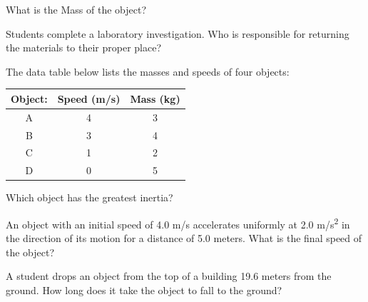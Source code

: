 \documentclass[10pt]{examdesign}
\begin{document}
\begin{multiplechoice} [title={Multiple Choice},
	rearrange=yes]
\begin{question}
	What is the Mass of the object?
	
\end{question}

\begin{question}
	Students complete a laboratory investigation.  Who is responsible for returning the materials to their proper place?
	\end{question}




\begin{question}
The data table below lists the masses and speeds of four objects:


\begin{center}
	\begin{tabular}{ | c | c | c | }
	\hline
		Object: & Speed (m/s) & Mass (kg) \\ 
		\hline
		A & 4 & 3 \\  
		\hline
		B & 3 & 4    \\
		\hline
		C & 1 & 2    \\
		\hline
		D & 0 & 5    \\
		\hline
	\end{tabular}
\end{center}

Which object has the greatest inertia?

\end{question}




\begin{question}
An object with an initial speed of 4.0 m/s accelerates uniformly at 2.0 m/s\textsuperscript{2} in the direction of its motion for a distance of 5.0 meters. What is the
final speed of the object? 
	\end{question}

\begin{question}
A student drops an object from the top of a building 19.6 meters from the ground. How long does it take the object to fall to the ground? 
\end{question}


\end{multiplechoice}
\end{document}
